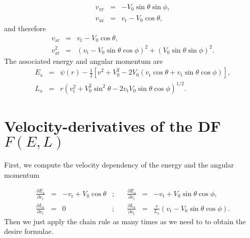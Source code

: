 \documentclass[11pt]{article}
\newcommand{\rt}{\mathrm{t}}
\newcommand{\rr}{\mathrm{r}}
\newcommand{\ry}{\mathrm{y}}
\newcommand{\rz}{\mathrm{z}}
\newcommand{\ra}{\mathrm{a}}
\newcommand{\vr}{v_{\rr}}
\newcommand{\vt}{v_{\rt}}
\newcommand{\vay}{v_{\ra \ry}}
\newcommand{\vaz}{v_{\ra \rz}}
\newcommand{\var}{v_{\ra \rr}}
\newcommand{\vat}{v_{\ra \rt}}
\newcommand{\Ea}{E_{\ra}}
\newcommand{\La}{L_{\ra}}
\begin{document}
\begin{appendices}
\begin{equation}
\begin{array}{ccl}
  \vay &=& \displaystyle{-V_{0}\sin\theta\sin\phi} , \\

  \vaz & =& \displaystyle{\vr - V_{0}\cos\theta} ,
\end{array}
\label{eq:va_coord}
\end{equation}
and therefore
\begin{equation}
  \begin{array}{ccl}
  \var & =&\displaystyle{\vr-V_{0}\cos\theta} ,\\

  \vat^{2} & =& \displaystyle{(\vt-V_{0}\sin\theta\cos\phi)^{2}+(V_{0}\sin\theta\sin\phi)^{2}} .
  \end{array}
  \label{eq:va_r_t}
\end{equation}
The associated energy and angular momentum are
\begin{equation}
  \begin{array}{ccl}
  \Ea & =&\displaystyle{\psi(r)-\frac{1}{2}\left[v^{2}+V_{0}^{2}-2V_{0}\left(\vr\cos\theta + \vt\sin\theta\cos\phi\right)\right]} ,\\

  \La & =& \displaystyle{r\left(\vt^{2}+V_{0}^{2}\sin^{2}\theta-2\vt V_{0}\sin\theta\cos\phi\right)^{1/2}} .
  \end{array}
  \label{eq:Ea_La}
\end{equation}

\section{Velocity-derivatives of the DF $F(E,L)$}
\label{app:fq_derivatives}

First, we compute the velocity dependency of the energy and the angular momentum

\begin{equation}
  \begin{array}{cclcccl}
  \displaystyle{\frac{\partial\Ea}{\partial \vr}} & =&\displaystyle{-\vr + V_{0} \cos\theta}&;\quad&  \displaystyle{\frac{\partial\Ea}{\partial \vt}} & =&\displaystyle{-\vt + V_{0}\sin\theta \cos\phi},\\

  \displaystyle{\frac{\partial\La}{\partial \vr}} & =&\displaystyle{
    0}&;\quad&  \displaystyle{\frac{\partial\La}{\partial \vt}} & =&\displaystyle{\frac{r}{\La} (\vt-V_{0}\sin\theta\cos\phi)} .
 
  \end{array}
  \label{eq:Ea_La}
\end{equation}
Then we just apply the chain rule as many times as we need to to obtain the desire formulae.


\end{appendices}
\end{document}
